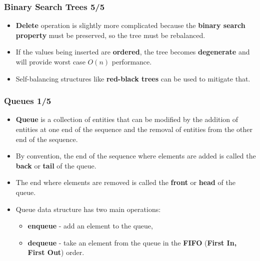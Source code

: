 \documentclass{beamer}
\begin{document}
\begin{frame}[fragile]
  \frametitle{Binary Search Trees 5/5}
  \begin{itemize}
  \item \textbf{Delete} operation is slightly more complicated because the
    \textbf{binary search property} must be preserved, so the tree must be
    rebalanced.
  \item If the values being inserted are \textbf{ordered}, the tree becomes
    \textbf{degenerate} and will provide worst case $O(n)$ performance.
  \item Self-balancing structures like \textbf{red-black trees} can be used to
    mitigate that.
  \end{itemize}
\end{frame}

\begin{frame}[fragile]
  \frametitle{Queues 1/5}
  \begin{itemize}
  \item \textbf{Queue} is a collection of entities that can be modified by the
    addition of entities at one end of the sequence and the removal of entities
    from the other end of the sequence.
  \item By convention, the end of the sequence where elements are added is
    called the \textbf{back} or \textbf{tail} of the queue.
  \item The end where elements are removed is called the \textbf{front} or
    \textbf{head} of the queue.
  \item Queue data structure has two main operations:
    \begin{itemize}
    \item \textbf{enqueue} - add an element to the queue,
    \item \textbf{dequeue} - take an element from the queue in the \textbf{FIFO}
      (\textbf{First In, First Out}) order.
    \end{itemize}
  \end{itemize}
\end{frame}
\end{document}
